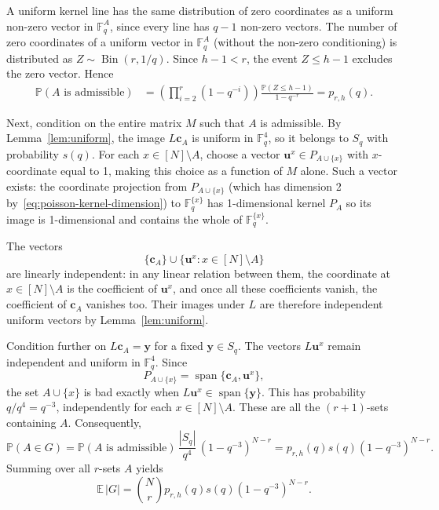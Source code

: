 \documentclass[12pt,a4paper]{article}
\numberwithin{equation}{section}
\theoremstyle{definition}
\theoremstyle{remark}
\newcommand{\V}[1]{\boldsymbol{#1}}
\begin{document}
A uniform kernel line has the same distribution of zero coordinates as a uniform non-zero vector in $\mathbb F_q^A$, since every line has $q-1$ non-zero vectors. The number of zero coordinates of a uniform vector in $\mathbb F_q^A$ (without the non-zero conditioning) is  distributed as $Z\sim\operatorname{Bin}(r,1/q)$. Since $h-1<r$, the event $Z\le h-1$ excludes the zero vector. Hence
\begin{align*}
	\mathbb P(A\text{ is admissible})
	&=\left(\prod_{i=2}^{r}(1-q^{-i})\right)
	\frac{\mathbb P(Z\le h-1)}{1-q^{-r}}
	=p_{r,h}(q).
	\label{eq:poisson-admissibility}
\end{align*}

Next, condition on the entire matrix $M$ such that $A$ is admissible. By Lemma~\ref{lem:uniform}, the image $L\V{c}_A$ is uniform in $\mathbb F_q^4$, so it belongs to $S_q$ with probability $s(q)$. For each $x\in[N]\setminus A$, choose a vector $\V{u}^x\in P_{A\cup\{x\}}$ with $x$-coordinate equal to 1, making this choice as a function of $M$ alone. Such a vector exists: the coordinate projection from  $P_{A\cup\{x\}}$ (which has dimension 2 by~\eqref{eq:poisson-kernel-dimension}) to $\mathbb F_q^{\{x\}}$ has 1-dimensional kernel $P_A$ so its image is 1-dimensional and contains the whole of $\mathbb F_q^{\{x\}}$.

The vectors
\[
\{\V{c}_A\}\cup\{\V{u}^x:x\in[N]\setminus A\}
\]
are linearly independent: in any linear relation between them, the coordinate at $x\in [N]\setminus A$ is the coefficient of $\V{u}^x$, and once all these coefficients vanish, the coefficient of $\V{c}_A$ vanishes too. Their images under $L$ are therefore independent uniform vectors by Lemma~\ref{lem:uniform}.

Condition further on $L\V{c}_A=\V{y}$ for a fixed $\V{y}\in S_q$. The vectors $L\V{u}^x$ remain independent and uniform in $\mathbb F_q^4$. Since
\[
P_{A\cup\{x\}}=\operatorname{span}\{\V{c}_A,\V{u}^x\},
\]
the set $A\cup\{x\}$ is bad exactly when $L\V{u}^x\in\operatorname{span}\{\V{y}\}$. This has probability $q/q^4=q^{-3}$, independently for each $x\in [N]\setminus A$. These are all the $(r+1)$-sets containing $A$. Consequently,
\begin{equation*}
	\mathbb P(A\in G)=\mathbb P(A\text{ is admissible})\, \frac{|S_q|}{q^4}\, (1-q^{-3})^{N-r}=p_{r,h}(q)s(q)(1-q^{-3})^{N-r}.
\end{equation*}
Summing over all $r$-sets $A$ yields
\begin{equation}\label{eq:poisson-expectation}
	\mathbb E\,|G|=\binom Nr p_{r,h}(q)s(q)(1-q^{-3})^{N-r}.
\end{equation}
\end{document}
